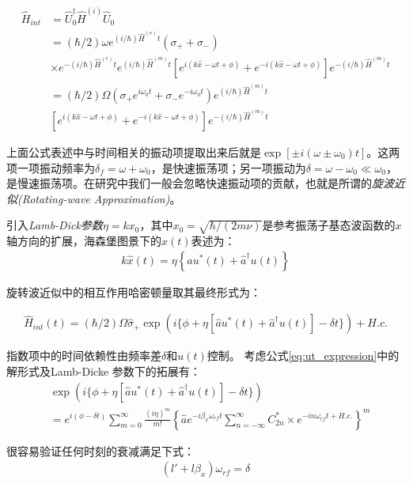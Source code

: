 \begin{align}
    \hat{H}_{int} &=\hat{U}_0^\dagger\hat{H}^{(i)}\hat{U}_0\\
    &=(\hbar/2)\omega e^{(i/\hbar)\hat{H}^{(e)}t}(\sigma_++\sigma_-)\\
    &\times e^{-(i/\hbar)\hat{H}^{(e)}t}e^{(i/\hbar)\hat{H}^{(m)}t}\left[e^{i(k\hat{x}-\omega t + \phi)}+e^{-i(k\hat{x}-\omega t + \phi)}\right]e^{-(i/\hbar)\hat{H}^{(m)}t}\\
    &=(\hbar/2)\Omega(\sigma_+e^{i\omega_0 t}+\sigma_-e^{-i\omega_0 t}) e^{(i/\hbar)\hat{H}^{(m)}t} \\
    &\left[e^{i(k\hat{x}-\omega t + \phi)}+e^{-i(k\hat{x}-\omega t + \phi)}\right]e^{-(i/\hbar)\hat{H}^{(m)}t}
\end{align}

上面公式表述中与时间相关的振动项提取出来后就是$\exp[\pm i (\omega\pm \omega_0)t]$。这两项一项振动频率为$\delta_f=\omega+\omega_0$，是快速振荡项；另一项振动为$\delta=\omega-\omega_0\ll \omega_0$，是慢速振荡项。在研究中我们一般会忽略快速振动项的贡献，也就是所谓的\emph{旋波近似(Rotating-wave Approximation)}。

引入\emph{Lamb-Dick参数}$\eta=kx_0$，其中$x_0=\sqrt{\hbar/(2m\nu)}$是参考振荡子基态波函数的$x$轴方向的扩展，海森堡图景下的$\hat{x}(t)$表述为：
\begin{align}
    k\hat{x}(t)=\eta\left\{\hat{a}u^*(t)+\hat{a}^\dagger u(t)\right\}
\end{align}

旋转波近似中的相互作用哈密顿量取其最终形式为：

\begin{align}
    \hat{H}_{int}(t)=(\hbar/2)\Omega\hat{\sigma}_+ \exp(i\{\phi+\eta[\hat{a}u^*(t)+\hat{a}^\dagger u(t)]-\delta t\})+H.c.
\end{align}

指数项中的时间依赖性由频率差$\delta$和$u(t)$控制。
考虑公式\eqref{eq:ut_expression}中的解形式及Lamb-Dicke 参数下的拓展有：
\begin{align}
    &\exp(i\{\phi + \eta [\hat{a}u^*(t)+\hat{a}^\dagger u(t)]-\delta t\})\\
    &=e^{i(\phi-\delta t)}\sum_{m=0}^{\infty} \frac{(i\eta)^m}{m!}\left\{\hat{a}e^{-i\beta_x\omega_{rf}t} \sum_{n=-\infty}^{\infty}C_{2n}^* \times e^{-i n\omega_{rf}t+H.c.}\right\}^m
\end{align}

很容易验证任何时刻的衰减满足下式：
\begin{align}
    (l'+l\beta_x)\omega_{rf}=\delta
\end{align}

